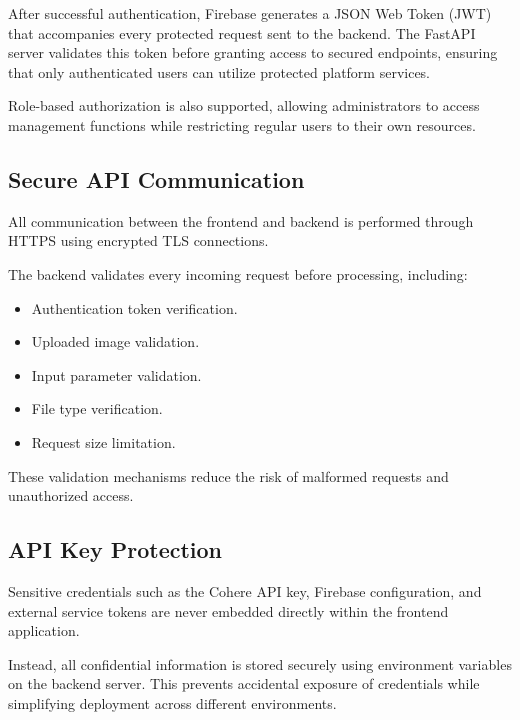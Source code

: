 After successful authentication, Firebase generates a JSON Web Token (JWT) that accompanies every protected request sent to the backend. The FastAPI server validates this token before granting access to secured endpoints, ensuring that only authenticated users can utilize protected platform services.

Role-based authorization is also supported, allowing administrators to access management functions while restricting regular users to their own resources.

\subsection{Secure API Communication}

All communication between the frontend and backend is performed through HTTPS using encrypted TLS connections.

The backend validates every incoming request before processing, including:

\begin{itemize}

\item Authentication token verification.

\item Uploaded image validation.

\item Input parameter validation.

\item File type verification.

\item Request size limitation.

\end{itemize}

These validation mechanisms reduce the risk of malformed requests and unauthorized access.

\subsection{API Key Protection}

Sensitive credentials such as the Cohere API key, Firebase configuration, and external service tokens are never embedded directly within the frontend application.

Instead, all confidential information is stored securely using environment variables on the backend server. This prevents accidental exposure of credentials while simplifying deployment across different environments.

